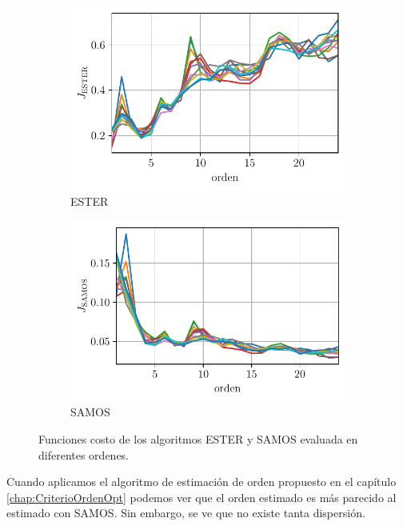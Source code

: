         \begin{figure}[ht]
            \centering
           \begin{subfigure}{0.4\linewidth}
			\centering
			\includegraphics[width = \linewidth]{Figuras/J_ester_UWB.pdf}
			\caption{ESTER}
		\end{subfigure}
        \begin{subfigure}{0.4\linewidth}
			\centering
			\includegraphics[width = \linewidth]{Figuras/J_samos_UWB.pdf}
			\caption{SAMOS}
		\end{subfigure}
        \caption{Funciones costo de los algoritmos ESTER y SAMOS evaluada en diferentes ordenes.}
        \label{Fig:EsterSamos_cil}    
        \end{figure}

     Cuando aplicamos el algoritmo de estimación de orden propuesto en el capítulo \ref{chap:CriterioOrdenOpt} podemos ver que el orden estimado es más parecido al estimado con SAMOS. Sin embargo, se ve que no existe tanta dispersión.

